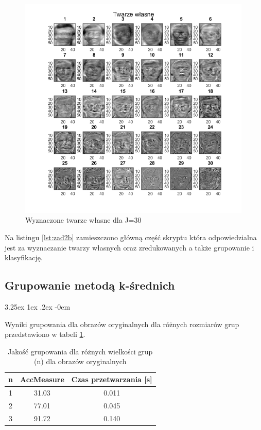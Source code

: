 \documentclass[11pt, a4paper]{article}
\makeatletter
\renewcommand\paragraph{\@startsection{paragraph}{5}{\z@}
  {3.25ex \@plus1ex \@minus.2ex}
  {-0em}
  {\normalfont\normalsize\bfseries}}
\makeatother
\begin{document}
\begin{figure}[H]
	\centering
	\includegraphics[width=0.99\textwidth]{./assets/ilustracja_zad2_eigen_j30.png}
	\caption{Wyznaczone twarze własne dla J=30}
	\label{fig:ilustracja_zad2_eigen_j30}
\end{figure}

Na listingu \ref{lst:zad2b} zamieszczono główną część skryptu która odpowiedzialna jest za wyznaczanie twarzy własnych oraz zredukowanych a także grupowanie i klasyfikację.



\subsection{Grupowanie metodą k-średnich}
\paragraph{}

Wyniki grupowania dla obrazów oryginalnych dla różnych rozmiarów grup przedstawiono w tabeli \ref{tab:wynikiGrupowaniaZwykle}.

\begin{table}[H]
	\centering
	\caption{Jakość grupowania dla różnych wielkości grup (n) dla obrazów oryginalnych}
	\begin{tabular}{|c|c|c|}
		\hline 
		n & AccMeasure & Czas przetwarzania [s] \\ 
		\hline
		1 & 31.03 & 0.011 \\
		\hline
		2 & 77.01 & 0.045 \\
		\hline
		3 & 91.72 & 0.140 \\
		\hline
	\end{tabular}
	\label{tab:wynikiGrupowaniaZwykle}
\end{table}
\end{document}
